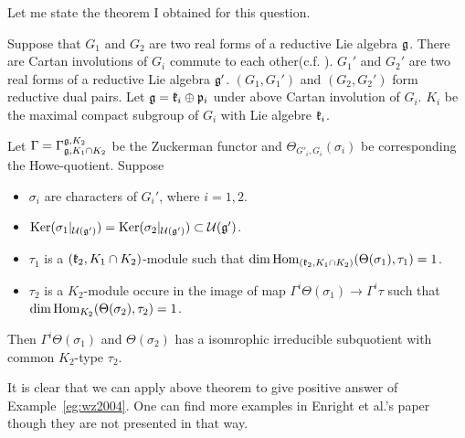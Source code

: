 \documentclass{amsart}
\begin{document}
Let me state the theorem I obtained for this question.
\begin{thm}\label{thm:scaler}
  Suppose that 
  $G_1$ and $G_2$ are two real forms of a reductive Lie algebra $\mathfrak{g}$.
  There are Cartan involutions of $G_i$ commute to each other(c.f. \cite{WallachZhu2004}).
  $G_1'$ and $G_2'$ are two real forms of a reductive Lie algebra $\mathfrak{g}'$.
  $(G_1,G_1')$ and $(G_2,G_2')$ form reductive dual pairs.
  Let
  $\mathfrak{g}=\mathfrak{k}_i \oplus \mathfrak{p}_i$ under above Cartan involution of $G_i$.
  $K_i$ be the maximal compact subgroup of $G_i$ with Lie algebre $\mathfrak{k}_i$.
 
  Let $\Gamma=\Gamma_{\mathfrak{g},K_1\cap K_2}^{\mathfrak{g}, K_2}$ be the Zuckerman functor
  and $\Theta_{G'_i,G_i}(\sigma_i)$ be corresponding the Howe-quotient.
  Suppose 
  \begin{itemize}
    \item $\sigma_i$ are characters of $G_i'$, where $i=1,2$. 
  \item  ${\rm Ker}(\sigma_1|_{\mathcal{U}(\mathfrak{g}')}) = {\rm Ker}(\sigma_2|_{\mathcal{U}(\mathfrak{g}')}) \subset \mathcal{U}(\mathfrak{g}')$.
  \item $\tau_1$ is a $(\mathfrak{k}_2,K_1\cap K_2)$-module such that
    $\dim {\rm Hom}_{(\mathfrak{k}_2,K_1\cap K_2)}(\Theta(\sigma_1),\tau_1) = 1$.
  \item $\tau_2$ is a $K_2$-module occure in the
    image of map $\Gamma^i \Theta(\sigma_1) \to \Gamma^i \tau$ 
    such that 
    $\dim {\rm Hom}_{K_2}(\Theta(\sigma_2),\tau_2) =1$.
  \end{itemize}
  Then $\Gamma^i \Theta(\sigma_1)$ and 
  $\Theta(\sigma_2)$ has a isomrophic irreducible subquotient 
  with common $K_2$-type $\tau_2$.
\end{thm}

\begin{rmk}
It is clear that we can apply above theorem to give positive answer of Example~\ref{eg:wz2004}.
One can find more examples in Enright et al.'s paper  \cite{Enright1985}
though they are not presented in that way. 
\end{rmk}
\end{document}
